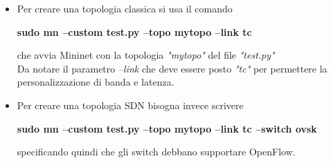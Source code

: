 \begin{itemize}
	\item Per creare una topologia classica si usa il comando
	\begin{center}
		\textbf{sudo mn --custom test.py --topo mytopo --link tc}
	\end{center}
	che avvia Mininet con la topologia \textit{"mytopo"} del file \textit{"test.py"}\\
	Da notare il parametro \textit{--link} che deve essere posto \textit{"tc"} per permettere la personalizzazione di banda e latenza.\\
	\item Per creare una topologia SDN bisogna invece scrivere
	\begin{center}
		\textbf{sudo mn --custom test.py --topo mytopo --link tc --switch ovsk}
	\end{center}
	specificando quindi che gli switch debbano supportare OpenFlow.\\
\end{itemize}

